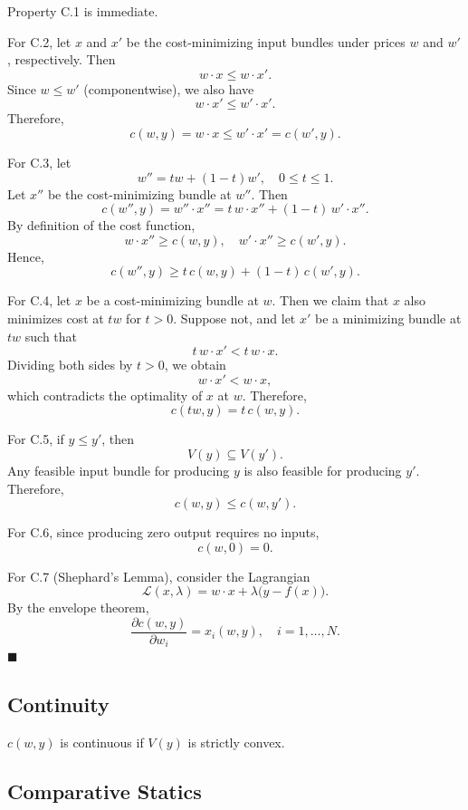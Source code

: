 Property C.1 is immediate.

\medskip

For C.2, let $x$ and $x'$ be the cost-minimizing input bundles under prices $w$ and $w'$, respectively. Then
\[
w \cdot x \leq w \cdot x'.
\]
Since $w \leq w'$ (componentwise), we also have
\[
w \cdot x' \leq w' \cdot x'.
\]
Therefore,
\[
c(w,y) = w \cdot x \leq w' \cdot x' = c(w',y).
\]

\medskip

For C.3, let
\[
w'' = t w + (1-t) w', \quad 0 \leq t \leq 1.
\]
Let $x''$ be the cost-minimizing bundle at $w''$. Then
\[
c(w'',y) = w'' \cdot x'' = t\, w \cdot x'' + (1-t)\, w' \cdot x''.
\]
By definition of the cost function,
\[
w \cdot x'' \geq c(w,y), \quad w' \cdot x'' \geq c(w',y).
\]
Hence,
\[
c(w'',y) \geq t\, c(w,y) + (1-t)\, c(w',y).
\]

\medskip

For C.4, let $x$ be a cost-minimizing bundle at $w$. Then we claim that $x$ also minimizes cost at $tw$ for $t>0$. Suppose not, and let $x'$ be a minimizing bundle at $tw$ such that
\[
t\, w \cdot x' < t\, w \cdot x.
\]
Dividing both sides by $t>0$, we obtain
\[
w \cdot x' < w \cdot x,
\]
which contradicts the optimality of $x$ at $w$. Therefore,
\[
c(tw,y) = t\, c(w,y).
\]

\medskip

For C.5, if $y \leq y'$, then
\[
V(y) \subseteq V(y').
\]
Any feasible input bundle for producing $y$ is also feasible for producing $y'$. Therefore,
\[
c(w,y) \leq c(w,y').
\]

\medskip

For C.6, since producing zero output requires no inputs,
\[
c(w,0) = 0.
\]

\medskip

For C.7 (Shephard's Lemma), consider the Lagrangian
\[
\mathcal{L}(x,\lambda) = w \cdot x + \lambda \bigl( y - f(x) \bigr).
\]
By the envelope theorem,
\[
\frac{\partial c(w,y)}{\partial w_i} = x_i(w,y), \quad i=1,\dots,N.
\]
\hfill $\blacksquare$

\subsection*{Continuity}

$c(w,y)$ is continuous if $V(y)$ is strictly convex.

\subsection*{Comparative Statics}


